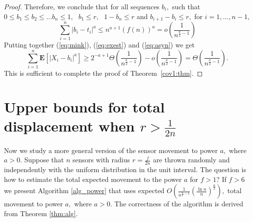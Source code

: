 \documentclass[final,5p,times,twocolumn]{elsarticle_mod}
\newcommand{\E}[1]{\mathbf{E}\left[#1\right]}
\begin{document}
\begin{proof}
Therefore, we conclude that for all sequences $b_i,$ such that $0\le b_1\le b_2\le \dots b_n\le 1,\,\,$
$b_1\le r,\,\,$ $1-b_n\le r$ and $b_{i+1}-b_i\le r,$ for $i=1,\dots , n-1,$
\begin{equation}
\label{eq:asyn}
\sum_{i=1}^{n}|b_i-t_i|^a\le n^{a+1} (f(n))^a=o\left(\frac{1}{n^{\frac{a}{2}-1}}\right)
\end{equation}
Putting together (\ref{eq:mink}), (\ref{eq:exest}) and (\ref{eq:asyn}) we get
$$
\sum_{i=1}^{n}\E{|X_i-b_i|^a}\ge2^{-a+1}\Theta \left(\frac{1}{n^{\frac{a}{2}-1}}\right)-o\left(\frac{1}{n^{\frac{a}{2}-1}}\right)=\Theta\left(\frac{1}{n^{\frac{a}{2}-1}}\right).
$$
This is sufficient to complete the proof of Theorem~\ref{cov1:thm}.
\end{proof}

\section{Upper bounds for total displacement when $r>\frac{1}{2n}$}
\label{upper bounds:sec}
Now we study a more general version of the sensor movement to power $a,$ where $a>0.$
Suppose that $n$ sensors with radius $r=\frac{f}{2n}$ are thrown randomly and independently with the uniform distribution in the unit interval.
The question is how to estimate the  total expected movement  to the power $a$ for $f>1$? 
If $f>6$ we present Algorithm \ref{alg_power} that uses expected 
$O\left(\frac{1}{n^{\frac{a}{2}-1}}\left(\frac{\ln n}{n}\right)^{\frac{a}{2}}\right),$
total movement to power $a,$ 
where $a>0.$ The correctness of the algorithm is derived from Theorem \ref{thm:alg}.
\end{document}
